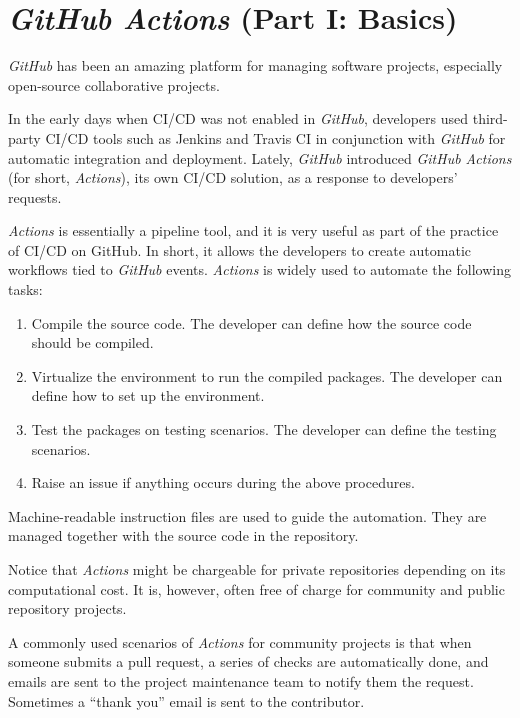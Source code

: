 \section{\textit{GitHub Actions} (Part I: Basics)}

\textit{GitHub} has been an amazing platform for managing software projects, especially open-source collaborative projects.

In the early days when CI/CD was not enabled in \textit{GitHub}, developers used third-party CI/CD tools such as Jenkins and Travis CI in conjunction with \textit{GitHub} for automatic integration and deployment. Lately, \textit{GitHub} introduced \textit{GitHub Actions} (for short, \textit{Actions}), its own CI/CD solution, as a response to developers' requests.

\textit{Actions} is essentially a pipeline tool, and it is very useful as part of the practice of CI/CD on GitHub. In short, it allows the developers to create automatic workflows tied to \textit{GitHub} events. \textit{Actions} is widely used to automate the following tasks:
\begin{enumerate}
  \item Compile the source code. The developer can define how the source code should be compiled.
  \item Virtualize the environment to run the compiled packages. The developer can define how to set up the environment.
  \item Test the packages on testing scenarios. The developer can define the testing scenarios.
  \item Raise an issue if anything occurs during the above procedures.
\end{enumerate}
Machine-readable instruction files are used to guide the automation. They are managed together with the source code in the repository.

Notice that \textit{Actions} might be chargeable for private repositories depending on its computational cost. It is, however, often free of charge for community and public repository projects.

A commonly used scenarios of \textit{Actions} for community projects is that when someone submits a pull request, a series of checks are automatically done, and emails are sent to the project maintenance team to notify them the request. Sometimes a ``thank you'' email is sent to the contributor.

